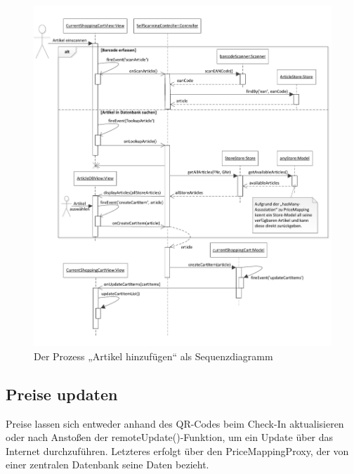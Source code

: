 \begin{figure}[H]
\includegraphics[width=\linewidth]{res/seq_artikel-hinzufuegen.pdf}
\caption{Der Prozess „Artikel hinzufügen“ als Sequenzdiagramm}
\end{figure}

\subsection{Preise updaten}
Preise lassen sich entweder anhand des QR-Codes beim Check-In aktualisieren oder nach Anstoßen der remoteUpdate()-Funktion, um ein Update über das Internet durchzuführen. Letzteres erfolgt über den PriceMappingProxy, der von einer zentralen Datenbank seine Daten bezieht.

